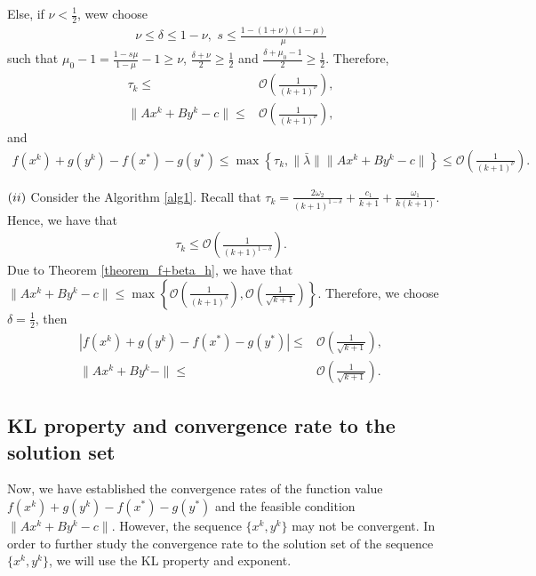 \documentclass{article}
\numberwithin{equation}{section}
\begin{document}
Else, if $\nu<\frac{1}{2}$, wew choose 
\begin{align}
    \nu \leq \delta \leq 1-\nu, \hspace{4pt} s\leq\frac{1-(1+\nu)(1-\mu)}{\mu} \nonumber 
\end{align}
such that $\mu_0-1=\frac{1-s\mu}{1-\mu}-1 \geq \nu$, $\frac{\delta+\nu}{2}\geq \frac{1}{2}$ and $
\frac{\delta+\mu_0-1}{2} \geq \frac{1}{2}$. Therefore,
\begin{align}
    \tau_k \leq&  \mathcal{O}\left( \frac{1}{(k+1)^{\nu}} \right), \nonumber \\
    \|Ax^k+ By^k -c\rVert \leq& \mathcal{O} \left( \frac{1}{(k+1)^{\nu}} \right), \nonumber
\end{align}
and 
\begin{align}
    f(x^k)+g(y^k) -f(x^*) -g(y^*) \leq \max\left\{ \tau_k, \|\bar{\lambda}\rVert\|Ax^k+By^k-c\rVert \right\} 
    \leq \mathcal{O} \left( \frac{1}{(k+1)^{\nu}} \right). \nonumber 
\end{align} 

$(\romannumeral2)$ Consider the Algorithm \ref{alg1}. 
Recall that $\tau_k= \frac{2\omega_2}{(k+1)^{1-\delta}}+ \frac{c_1}{k+1}+ \frac{\omega_1}{k(k+1)}$. 
Hence, we have that
\begin{align}
    \tau_k\leq \mathcal{O}\left( \frac{1}{(k+1)^{1-\delta}} \right). \nonumber
\end{align} 
Due to Theorem \ref{theorem_f+beta_h}, we have that 
$\|Ax^k+ By^k- c\rVert \leq \max\left\{ \mathcal{O} \left( \frac{1}{(k+1)^{\delta}} \right), 
\mathcal{O} \left( \frac{1}{\sqrt{k+1}} \right)\right\}$. 
Therefore, we choose $\delta = \frac{1}{2}$, then 
\begin{align}
    \left| f(x^k)+ g(y^k)- f(x^*)- g(y^*) \right| \leq& \mathcal{O}\left( \frac{1}{\sqrt{k+1}} \right), \nonumber \\
    \|Ax^k+ By^k- \rVert \leq& \mathcal{O}\left( \frac{1}{\sqrt{k+1}} \right).   \nonumber
\end{align}

\subsection{KL property and convergence rate to the solution set}
Now, we have established the convergence rates of the function value $f(x^k)+ g(y^k) -f(x^*)- g(y^*)$ and the 
feasible condition $\|Ax^k + By^k - c\rVert$. However, the sequence $\{x^k,y^k\}$ may not be 
convergent. In order to further study the convergence rate to the solution set of the sequence $\{x^k,y^k\}$, we will use the KL property and
exponent. 
\end{document}
